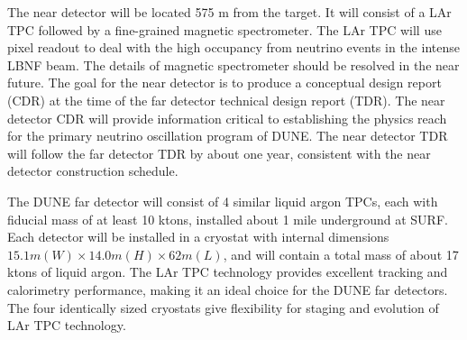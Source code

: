 The near detector will be located 575 m from the target. It will consist of a LAr TPC followed by a fine-grained magnetic spectrometer. The LAr TPC will use pixel readout to deal with the high occupancy from neutrino events in the intense LBNF beam. The details of magnetic spectrometer should be resolved in the near future. The goal for the near detector is to produce a conceptual design report (CDR) at the time of the far detector technical design report (TDR). The near detector CDR will provide information critical to establishing the physics reach for the primary neutrino oscillation program of DUNE. The near detector TDR will follow the far detector TDR by about one year, consistent with the near detector construction schedule.

The DUNE far detector will consist of 4 similar liquid argon TPCs, each with fiducial mass of at least 10 ktons, installed about 1 mile underground at SURF. Each detector will be installed in a cryostat with internal dimensions
$15.1 m (W) \times 14.0 m (H) \times 62 m (L)$, and will contain a total mass of about 17 ktons of liquid argon.
The LAr TPC technology provides
excellent tracking and calorimetry performance, making it an ideal
choice for the DUNE far detectors. The four identically sized cryostats give flexibility for staging and evolution of LAr TPC technology.

